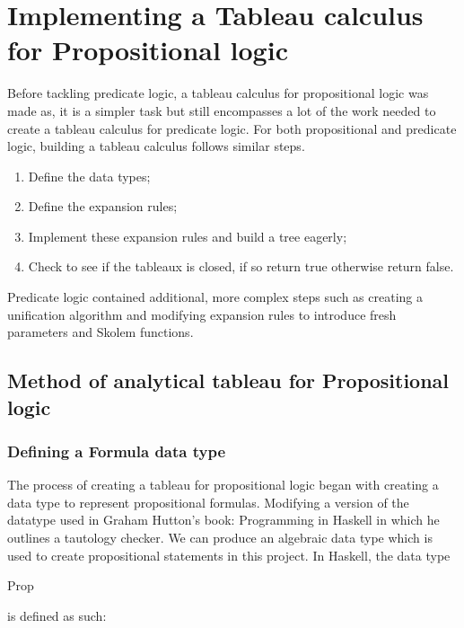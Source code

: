 \documentclass{article}%
\begin{document}
\section{Implementing a Tableau calculus for Propositional logic}
Before tackling predicate logic, a tableau calculus for propositional logic was made as, it is a simpler task but still encompasses a lot of the work needed to create a tableau calculus for predicate logic. For both propositional and predicate logic, building a tableau calculus follows similar steps. \begin{enumerate}
\item Define the data types; 
\item Define the expansion rules; 
\item Implement these expansion rules and build a tree eagerly;
\item Check to see if the tableaux is closed, if so return true otherwise return false. 
\end{enumerate}
Predicate logic contained additional, more complex steps such as creating a unification algorithm and modifying expansion rules to introduce fresh parameters and Skolem functions. 
\subsection{Method of analytical tableau for Propositional logic}

\subsubsection{Defining a Formula data type}
The process of creating a tableau for propositional logic began with creating a data type to represent propositional formulas.  Modifying a version of the datatype used in Graham Hutton's book: Programming in Haskell in which he outlines a tautology checker. We can produce an algebraic data type which is used to create propositional statements in this project.
In Haskell, the data type \begin{myTypeVarStyle}Prop\end{myTypeVarStyle} is defined as such: 
\vspace{5mm}
\end{document}
